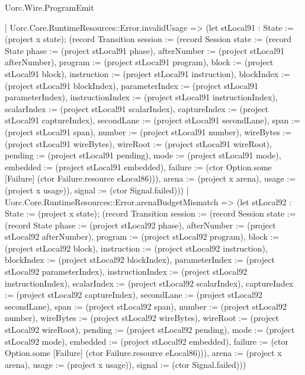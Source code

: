 \begin{lexlean}{Uorc.Wire.ProgramEmit}
\begin{semanticmodule}
{      | Uorc.Core.RuntimeResources::Error.invalidUsage => (let stLocal91 : State := (project x state); (record Transition {session := (record Session {state := (record State {phase := (project stLocal91 phase), afterNumber := (project stLocal91 afterNumber), program := (project stLocal91 program), block := (project stLocal91 block), instruction := (project stLocal91 instruction), blockIndex := (project stLocal91 blockIndex), parameterIndex := (project stLocal91 parameterIndex), instructionIndex := (project stLocal91 instructionIndex), scalarIndex := (project stLocal91 scalarIndex), captureIndex := (project stLocal91 captureIndex), secondLane := (project stLocal91 secondLane), span := (project stLocal91 span), number := (project stLocal91 number), wireBytes := (project stLocal91 wireBytes), wireRoot := (project stLocal91 wireRoot), pending := (project stLocal91 pending), mode := (project stLocal91 mode), embedded := (project stLocal91 embedded), failure := (ctor Option.some [Failure] (ctor Failure.resource eLocal86))}), arena := (project x arena), usage := (project x usage)}), signal := (ctor Signal.failed)}))
      | Uorc.Core.RuntimeResources::Error.arenaBudgetMismatch => (let stLocal92 : State := (project x state); (record Transition {session := (record Session {state := (record State {phase := (project stLocal92 phase), afterNumber := (project stLocal92 afterNumber), program := (project stLocal92 program), block := (project stLocal92 block), instruction := (project stLocal92 instruction), blockIndex := (project stLocal92 blockIndex), parameterIndex := (project stLocal92 parameterIndex), instructionIndex := (project stLocal92 instructionIndex), scalarIndex := (project stLocal92 scalarIndex), captureIndex := (project stLocal92 captureIndex), secondLane := (project stLocal92 secondLane), span := (project stLocal92 span), number := (project stLocal92 number), wireBytes := (project stLocal92 wireBytes), wireRoot := (project stLocal92 wireRoot), pending := (project stLocal92 pending), mode := (project stLocal92 mode), embedded := (project stLocal92 embedded), failure := (ctor Option.some [Failure] (ctor Failure.resource eLocal86))}), arena := (project x arena), usage := (project x usage)}), signal := (ctor Signal.failed)}))
}
\end{semanticmodule}
\end{lexlean}
